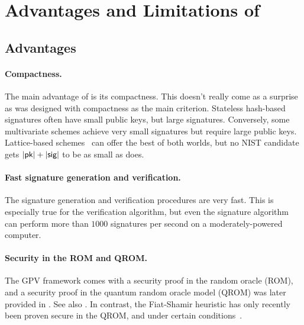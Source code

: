 
\section{Advantages and Limitations of \falcon}\label{sec:ratio:advantages}


\subsection{Advantages}

\paragraph{Compactness.} The main advantage of \falcon is its compactness. This doesn't really come as a surprise as \falcon was designed with compactness as the main criterion. Stateless hash-based signatures often have small public keys, but large signatures. Conversely, some multivariate schemes achieve very small signatures but require large public keys. Lattice-based schemes~\cite{NISTPQC-R2:CRYSTALS-DILITHIUM19} can offer the best of both worlds, but no NIST candidate gets $|\textsf{pk}|+|\textsf{sig}|$ to be as small as \falcon does.

\paragraph{Fast signature generation and verification.} The signature generation and verification procedures are very fast. This is especially true for the verification algorithm, but even the signature algorithm can perform more than $1000$ signatures per second on a moderately-powered computer.

\paragraph{Security in the ROM and QROM.} The GPV framework comes with a security proof in the random oracle (ROM), and a security proof in the quantum random oracle model (QROM) was later provided in \cite{AC:BDFLSZ11}. See also \cite{PKC:ChaDeb20}. In contrast, the Fiat-Shamir heuristic has only recently been proven secure in the QROM, and under certain conditions~\cite{C:LiuZha19,C:DFMS19}.

